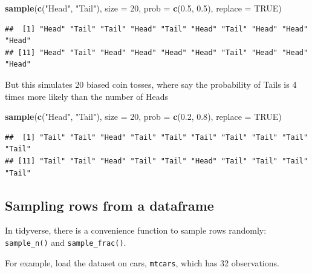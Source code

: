 \documentclass[
]{book}
\newenvironment{Shaded}{\begin{snugshade}}{\end{snugshade}}
\newcommand{\DataTypeTok}[1]{\textcolor[rgb]{0.13,0.29,0.53}{#1}}
\newcommand{\DecValTok}[1]{\textcolor[rgb]{0.00,0.00,0.81}{#1}}
\newcommand{\FloatTok}[1]{\textcolor[rgb]{0.00,0.00,0.81}{#1}}
\newcommand{\KeywordTok}[1]{\textcolor[rgb]{0.13,0.29,0.53}{\textbf{#1}}}
\newcommand{\NormalTok}[1]{#1}
\newcommand{\OtherTok}[1]{\textcolor[rgb]{0.56,0.35,0.01}{#1}}
\newcommand{\StringTok}[1]{\textcolor[rgb]{0.31,0.60,0.02}{#1}}
\theoremstyle{definition}
\theoremstyle{definition}
\theoremstyle{definition}
\theoremstyle{definition}
\theoremstyle{remark}
\begin{document}
\begin{Shaded}
\begin{Highlighting}[]
\KeywordTok{sample}\NormalTok{(}\KeywordTok{c}\NormalTok{(}\StringTok{"Head"}\NormalTok{, }\StringTok{"Tail"}\NormalTok{), }\DataTypeTok{size =} \DecValTok{20}\NormalTok{, }\DataTypeTok{prob =} \KeywordTok{c}\NormalTok{(}\FloatTok{0.5}\NormalTok{, }\FloatTok{0.5}\NormalTok{), }\DataTypeTok{replace =} \OtherTok{TRUE}\NormalTok{)}
\end{Highlighting}
\end{Shaded}

\begin{verbatim}
##  [1] "Head" "Tail" "Tail" "Head" "Tail" "Head" "Tail" "Head" "Head" "Head"
## [11] "Head" "Tail" "Head" "Head" "Head" "Head" "Tail" "Head" "Head" "Head"
\end{verbatim}

But this simulates 20 biased coin tosses, where say the probability of Tails is 4 times more likely than the number of Heads

\begin{Shaded}
\begin{Highlighting}[]
\KeywordTok{sample}\NormalTok{(}\KeywordTok{c}\NormalTok{(}\StringTok{"Head"}\NormalTok{, }\StringTok{"Tail"}\NormalTok{), }\DataTypeTok{size =} \DecValTok{20}\NormalTok{, }\DataTypeTok{prob =} \KeywordTok{c}\NormalTok{(}\FloatTok{0.2}\NormalTok{, }\FloatTok{0.8}\NormalTok{), }\DataTypeTok{replace =} \OtherTok{TRUE}\NormalTok{)}
\end{Highlighting}
\end{Shaded}

\begin{verbatim}
##  [1] "Tail" "Tail" "Head" "Tail" "Tail" "Tail" "Tail" "Tail" "Tail" "Tail"
## [11] "Tail" "Tail" "Head" "Tail" "Tail" "Head" "Tail" "Tail" "Tail" "Tail"
\end{verbatim}

\hypertarget{sampling-rows-from-a-dataframe}{%
\subsection{Sampling rows from a dataframe}\label{sampling-rows-from-a-dataframe}}

In tidyverse, there is a convenience function to sample rows randomly: \texttt{sample\_n()} and \texttt{sample\_frac()}.

For example, load the dataset on cars, \texttt{mtcars}, which has 32 observations.
\end{document}
